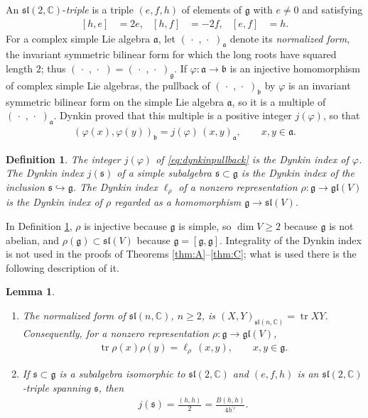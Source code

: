 \documentclass[leqno,10pt]{amsart}
\newtheorem{lemma}[theorem]{Lemma}%
\newtheorem{definition}[theorem]{Definition}%
\theoremstyle{definition}
\numberwithin{equation}{section}
\newcommand{\dum}{\,\cdot\,\,}
\newcommand{\gl}{\mathfrak{gl}}
\newcommand{\sll}{\mathfrak{sl}}
\newcommand{\g}{\mathfrak{g}}
\newcommand{\com}{\mathbb C}
\newcommand{\tr}{\operatorname{tr}}
\newcommand{\hv}{h^\vee}
\newcommand{\subs}{\mathfrak{s}}
\begin{document}
An $\sll(2,\com)$-\emph{triple} is a triple $(e,f,h)$ of elements of $\g$ with $e \neq 0$ and satisfying
\begin{align}\label{eq:sl2triple}
[h,e]&=2e, & [h,f]&=-2f, & [e,f]&=h.
\end{align}
For a complex simple Lie algebra $\mathfrak{a}$, let $(\dum, \dum)_{\mathfrak{a}}$ denote its \emph{normalized form}, the invariant symmetric bilinear form for which the long roots have squared length $2$; thus $(\dum, \dum) = (\dum, \dum)_{\g}$. If $\varphi:\mathfrak{a} \to \mathfrak{b}$ is an injective homomorphism of complex simple Lie algebras, the pullback of $(\dum, \dum)_{\mathfrak{b}}$ by $\varphi$ is an invariant symmetric bilinear form on the simple Lie algebra $\mathfrak{a}$, so it is a multiple of $(\dum, \dum)_{\mathfrak{a}}$. Dynkin \cite[Theorem~2.2]{Dynkin-semisimplesubalgebras} proved that this multiple is a positive integer $j(\varphi)$, so that
\begin{align}\label{eq:dynkinpullback}
(\varphi(x), \varphi(y))_{\mathfrak{b}} = j(\varphi)\,(x, y)_{\mathfrak{a}}, \qquad x, y \in \mathfrak{a}.
\end{align}

\begin{definition}\label{def:dynkin}
The integer $j(\varphi)$ of \eqref{eq:dynkinpullback} is the \emph{Dynkin index} of $\varphi$. The Dynkin index $j(\subs)$ of a simple subalgebra $\subs \subset \g$ is the Dynkin index of the inclusion $\subs \hookrightarrow \g$. The Dynkin index $\ell_{\rho}$ of a nonzero representation $\rho:\g \to \gl(V)$ is the Dynkin index of $\rho$ regarded as a homomorphism $\g \to \sll(V)$.
\end{definition}

In Definition \ref{def:dynkin}, $\rho$ is injective because $\g$ is simple, so $\dim V \geq 2$ because $\g$ is not abelian, and $\rho(\g) \subset \sll(V)$ because $\g = [\g, \g]$. Integrality of the Dynkin index is not used in the proofs of Theorems \ref{thm:A}--\ref{thm:C}; what is used there is the following description of it.

\vfill
\begin{lemma}\label{lem:dynkinformula}
\leavevmode\noindent
\begin{enumerate}[label=(\arabic*), ref=(\arabic*)]
\item\label{dynkinformula1} The normalized form of $\sll(n, \com)$, $n \geq 2$, is $(X, Y)_{\sll(n, \com)} = \tr XY$. Consequently, for a nonzero representation $\rho:\g \to \gl(V)$,
\begin{align}\label{eq:repindex}
\tr \rho(x)\rho(y) = \ell_{\rho}\,(x, y), \qquad x, y \in \g.
\end{align}
\item\label{dynkinformula2} If $\subs \subset \g$ is a subalgebra isomorphic to $\sll(2, \com)$ and $(e, f, h)$ is an $\sll(2, \com)$-triple spanning $\subs$, then
\begin{align}\label{eq:dynkinindex}
j(\subs) = \frac{(h, h)}{2} = \frac{B(h, h)}{4\hv}.
\end{align}
\end{enumerate}
\end{lemma}
\end{document}
